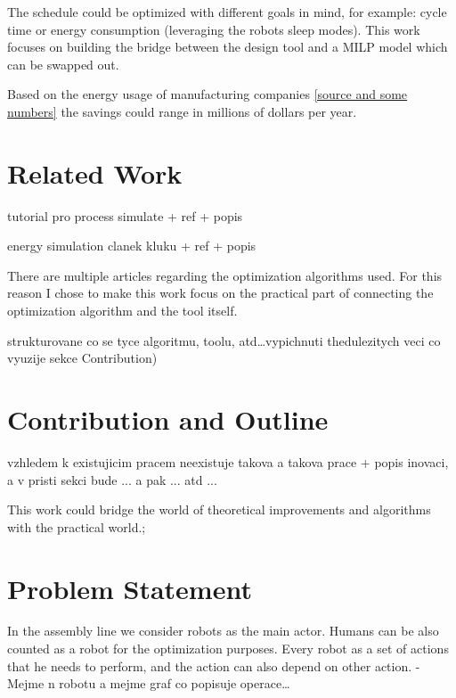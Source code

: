 The schedule could be optimized with different goals in mind, for example: cycle time or energy consumption (leveraging the robots sleep modes). This work focuses on building the bridge between the design tool and a MILP model which can be swapped out. 

Based on the energy usage of manufacturing companies \ref{source and some numbers} the savings could range in millions of dollars per year.

\section{Related Work}

tutorial pro process simulate + ref + popis

energy simulation clanek kluku + ref + popis

 

There are multiple articles regarding the optimization algorithms used. For this reason I chose to make this work focus on the practical part of connecting the optimization algorithm and the tool itself.


strukturovane co se tyce algoritmu, toolu, atd\ldots vypichnuti thedulezitych veci co vyuzije sekce Contribution)

\section{Contribution and Outline}

vzhledem k existujicim pracem neexistuje takova a takova prace + popis inovaci, a v pristi sekci bude ... a pak ... atd ...

This work could bridge the world of theoretical improvements and algorithms with the practical world.; 

\section{Problem Statement}

In the assembly line we consider robots as the main actor. Humans can be also counted as a robot for the optimization purposes. Every robot as a set of actions that he needs to perform, and the action can also depend on other action. 
- Mejme n robotu a mejme graf co popisuje operace\ldots 
